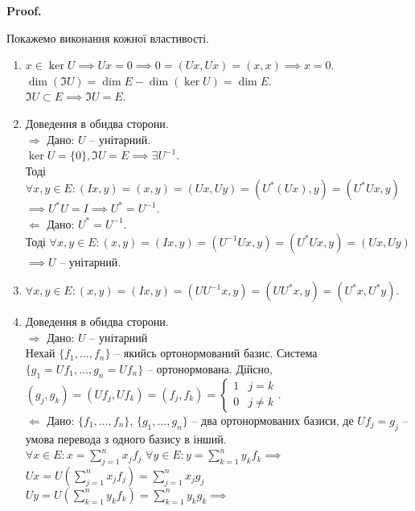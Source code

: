 \documentclass[a4paper, 10pt]{article}
\makeatletter
\def\rightproof{$\boxed{\Rightarrow}$ }
\def\leftproof{$\boxed{\Leftarrow}$ }
\theoremstyle{theoremdd}
\renewenvironment{proof}[1][Proof.\\]{\par
\pushQED{\hfill \qed}%
\normalfont \topsep6\p@\@plus6\p@\relax
\trivlist
\item\relax
{\bfseries
#1\@addpunct{.}}\hspace\labelsep\ignorespaces
}{%
\popQED\endtrivlist\@endpefalse
}
\makeatother
\begin{document}
\begin{proof}
Покажемо виконання кожної властивості.
\begin{enumerate}[topsep=-\parskip, wide=0pt, label={\arabic*)}]
\item $x \in \ker U \implies Ux = 0 \implies 0 = (Ux, Ux) = (x,x) \implies x = 0$.\\
$\dim(\Im U) = \dim E - \dim(\ker U) = \dim E$.\\
$\Im U \subset E \implies \Im U = E$.

\item Доведення в обидва сторони.\\
\rightproof Дано: $U$ -- унітарний.\\
$\ker U = \{0\}, \Im U = E \implies \exists U^{-1}$.\\
Тоді $\forall x,y \in E: (Ix,y) = (x,y) = (Ux,Uy) = (U^*(Ux), y) = (U^*Ux,y)$\\
$\implies U^* U = I \implies U^* = U^{-1}$.
\bigskip \\
\leftproof Дано: $U^* = U^{-1}$.\\
Тоді $\forall x,y \in E: (x,y) = (Ix, y) = (U^{-1}Ux, y) = (U^*Ux,y) = (Ux, Uy)$\\
$\implies U$ -- унітарний.
\item $\forall x,y \in E: (x,y) = (Ix,y) = (UU^{-1}x,y) = (UU^* x,y) = (U^*x,U^*y)$.
\item Доведення в обидва сторони.\\
\rightproof Дано: $U$ -- унітарний\\
Нехай $\{f_1,\dots,f_n\}$ -- якийсь ортонормований базис. Система $\{g_1 = Uf_1, \dots, g_n = Uf_n\}$ -- ортонормована. Дійсно,\\
$(g_j,g_k) = (Uf_j, Uf_k) = (f_j,f_k) = \begin{cases} 1 & j = k \\ 0 & j \neq k \end{cases}$.
\bigskip \\
\leftproof Дано: $\{f_1,\dots,f_n\}$, $\{g_1,\dots,g_n\}$ -- два ортонормованих базиси, де $Uf_j = g_j$ -- умова перевода з одного базису в інший.\\
$\forall x \in E: x = \displaystyle \sum_{j=1}^n x_j f_j$
\hspace{2.3cm}
$\forall y \in E: y = \displaystyle \sum_{k=1}^n y_k f_k \implies$\\
$Ux = \displaystyle U\left(\sum_{j=1}^n x_j f_j \right) = \sum_{j=1}^n x_j g_j$
\hspace{0.8cm}
$Uy = \displaystyle U\left(\sum_{k=1}^n y_k f_k \right) = \sum_{k=1}^n y_k g_k \implies$\\

\end{enumerate}
\end{proof}
\end{document}

